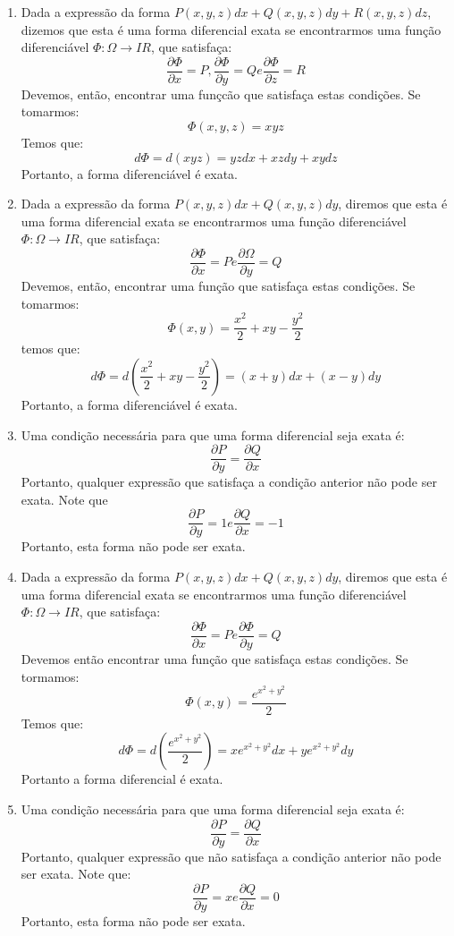 \documentclass[11pt,a4paper]{article}
\begin{document}
\begin{enumerate}
\item Dada a express\~{a}o da forma $ P(x,y,z)dx + Q(x,y,z)dy + R(x,y,z)dz $, dizemos que esta \'{e} uma forma diferencial exata se encontrarmos uma fun\c{c}\~{a}o diferenci\'{a}vel $ \Phi : \Omega \longrightarrow I\!R $, que satisfa\c{c}a: $$ \frac{\partial \Phi}{\partial x} = P, \frac{\partial \Phi}{\partial y} = Q e \frac{\partial \Phi}{\partial z} = R $$ Devemos, ent\~{a}o, encontrar uma fun\c{c}c\~{a}o que satisfa\c{c}a estas condi\c{c}\~{o}es. Se tomarmos: $$ \Phi (x,y,z) = xyz $$ Temos que: $$ d \Phi = d (xyz) = yzdx + xzdy + xydz $$ Portanto, a forma diferenci\'{a}vel \'{e} exata.

\item Dada a express\~{a}o da forma $ P(x,y,z)dx + Q(x,y,z)dy $, diremos que esta \'{e} uma forma diferencial exata se encontrarmos uma fun\c{c}\~{a}o diferenci\'{a}vel $ \Phi : \Omega \longrightarrow I\!R $, que satisfa\c{c}a: $$ \frac{\partial \Phi}{\partial x} = P  e  \frac{\partial \Omega}{\partial y} = Q $$ Devemos, ent\~{a}o, encontrar uma fun\c{c}\~{a}o que satisfa\c{c}a estas condi\c{c}\~{o}es. Se tomarmos: $$ \Phi (x,y) = \frac{x^2}{2} + xy - \frac{y^2}{2} $$ temos que: $$ d \Phi = d \left(\frac{x^2}{2} + xy - \frac{y^2}{2}\right) = (x+y)dx + (x-y)dy $$ Portanto, a forma diferenci\'{a}vel \'{e} exata.

\item Uma condi\c{c}\~{a}o necess\'{a}ria para que uma forma diferencial seja exata \'{e}: $$ \frac{\partial P}{\partial y} = \frac{\partial Q}{\partial x} $$ Portanto, qualquer express\~{a}o que satisfa\c{c}a a condi\c{c}\~{a}o anterior n\~{a}o pode ser exata. Note que $$ \frac{\partial P}{\partial y} = 1 e \frac{\partial Q}{\partial x} = -1 $$ Portanto, esta forma n\~{a}o pode ser exata.

\item Dada a express\~{a}o da forma $ P(x,y,z)dx + Q(x,y,z)dy $, diremos que esta \'{e} uma forma diferencial exata se encontrarmos uma fun\c{c}\~{a}o diferenci\'{a}vel $ \Phi : \Omega \longrightarrow I\!R $, que satisfa\c{c}a: $$ \frac{\partial \Phi}{\partial x} = P e \frac{\partial \Phi}{\partial y} = Q $$ Devemos ent\~{a}o encontrar uma fun\c{c}\~{a}o que satisfa\c{c}a estas condi\c{c}\~{o}es. Se tormamos: $$ \Phi \left(x,y\right) = \frac{e^{x^2 + y^2}}{2} $$ Temos que: $$ d\Phi = d\left(\frac{e^{x^2 + y^2}}{2} \right) = xe^{x^2 + y^2} dx + ye^{x^2 + y^2} dy $$ Portanto a forma diferencial \'{e} exata.

\item Uma condi\c{c}\~{a}o necess\'{a}ria para que uma forma diferencial seja exata \'{e}: $$ \frac{\partial P}{\partial y} = \frac{\partial Q}{\partial x} $$ Portanto, qualquer express\~{a}o que n\~{a}o satisfa\c{c}a a condi\c{c}\~{a}o anterior n\~{a}o pode ser exata. Note que: $$ \frac{\partial P}{\partial y} = x e \frac{\partial Q}{\partial x} = 0 $$ Portanto, esta forma n\~{a}o pode ser exata.


\end{enumerate}
\end{document}
